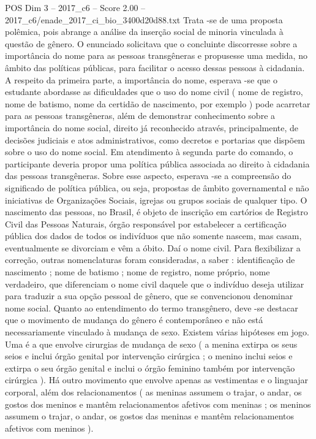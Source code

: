 \begin{textsample}{POS Dim 3 – 2017\_c6 – Score 2.00 – 2017\_c6/enade\_2017\_ci\_bio\_3400d20d88.txt}
Trata -se de uma proposta polêmica, pois abrange a análise da inserção social de minoria vinculada à questão de gênero.
O enunciado solicitava que o concluinte discorresse sobre a importância do nome para as pessoas transgêneras e propusesse uma medida, no âmbito das políticas públicas, para facilitar o acesso dessas pessoas à cidadania.
A respeito da primeira parte, a importância do nome, esperava -se que o estudante abordasse as dificuldades que o uso do nome civil ( nome de registro, nome de batismo, nome da certidão de nascimento, por exemplo ) pode acarretar para as pessoas transgêneras, além de demonstrar conhecimento sobre a importância do nome social, direito já reconhecido através, principalmente, de decisões judiciais e atos administrativos, como decretos e portarias que dispõem sobre o uso do nome social.
Em atendimento à segunda parte do comando, o participante deveria propor uma política pública associada ao direito à cidadania das pessoas transgêneras.
Sobre esse aspecto, esperava -se a compreensão do significado de política pública, ou seja, propostas de âmbito governamental e não iniciativas de Organizações Sociais, igrejas ou grupos sociais de qualquer tipo.
O nascimento das pessoas, no Brasil, é objeto de inscrição em cartórios de Registro Civil das Pessoas Naturais, órgão responsável por estabelecer a certificação pública dos dados de todos os indivíduos que não somente nascem, mas casam, eventualmente se divorciam e vêm a óbito.
Daí o nome civil.
Para flexibilizar a correção, outras nomenclaturas foram consideradas, a saber : identificação de nascimento ; nome de batismo ; nome de registro, nome próprio, nome verdadeiro, que diferenciam o nome civil daquele que o indivíduo deseja utilizar para traduzir a sua opção pessoal de gênero, que se convencionou denominar nome social.
Quanto ao entendimento do termo transgênero, deve -se destacar que o movimento de mudança do gênero é contemporâneo e não está necessariamente vinculado à mudança de sexo.
Existem várias hipóteses em jogo.
Uma é a que envolve cirurgias de mudança de sexo ( a menina extirpa os seus seios e inclui órgão genital por intervenção cirúrgica ; o menino inclui seios e extirpa o seu órgão genital e inclui o órgão feminino também por intervenção cirúrgica ).
Há outro movimento que envolve apenas as vestimentas e o linguajar corporal, além dos relacionamentos ( as meninas assumem o trajar, o andar, os gostos dos meninos e mantêm relacionamentos afetivos com meninas ; os meninos assumem o trajar, o andar, os gostos das meninas e mantêm relacionamentos afetivos com meninos ).

\end{textsample}
